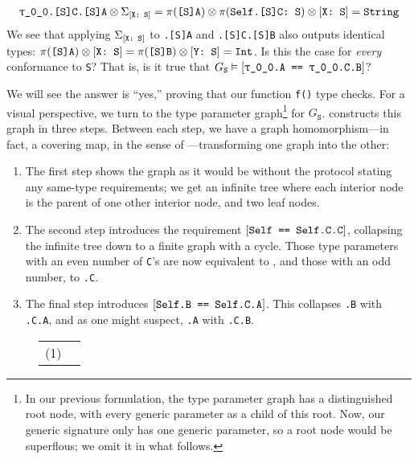 \documentclass[../generics]{subfiles}
\begin{document}
\begin{example}
\begin{gather*}
\texttt{\texttt{$\uptau$\_0\_0}.[S]C.[S]A}\otimes\Sigma_{[\texttt{X:~S}]}=\pi(\texttt{[S]A})\otimes\pi(\texttt{Self.[S]C:~S})\otimes[\texttt{X:~S}]=\texttt{String}
\end{gather*}
We see that applying $\Sigma_{[\texttt{X:~S}]}$ to \texttt{.[S]A} and \texttt{.[S]C.[S]B} also outputs identical types: $\pi(\texttt{[S]A})\otimes[\texttt{X:~S}]=\pi(\texttt{[S]B})\otimes[\texttt{Y:~S}]=\texttt{Int}$. Is this the case for \emph{every} conformance to \texttt{S}? That is, is it true that $G_\texttt{S}\vDash[\texttt{\texttt{\texttt{$\uptau$\_0\_0}.A} == \texttt{\texttt{$\uptau$\_0\_0}.C.B}}]$?

We will see the answer is ``yes,'' proving that our function \texttt{f()} type checks. For a visual perspective, we turn to the type parameter graph\footnote{In our previous formulation, the type parameter graph has a distinguished root node, with every generic parameter as a child of this root. Now, our generic signature only has one generic parameter, so a root node would be superflous; we omit it in what follows.} for $G_\texttt{S}$.  constructs this graph in three steps. Between each step, we have a graph homomorphism---in fact, a covering map, in the sense of ---transforming one graph into the other:
\begin{enumerate}
\item The first step shows the graph as it would be without the protocol stating any same-type requirements; we get an infinite tree where each interior node is the parent of one other interior node, and two leaf nodes.

\item The second step introduces the requirement $[\texttt{Self == Self.C.C}]$, collapsing the infinite tree down to a finite graph with a cycle. Those type parameters with an even number of \texttt{C}'s are now equivalent to \texttt{}, and those with an odd number, to \texttt{.C}.

\item The final step introduces $[\texttt{Self.B == Self.C.A}]$. This collapses \texttt{.B} with \texttt{.C.A}, and as one might suspect, \texttt{.A} with \texttt{.C.B}.
\end{enumerate}

\begin{figure}\label{protocol s fig}
\begin{center}
\begin{tabular}{lc}
\toprule
(1) &
\begin{tikzpicture}


\end{tikzpicture}
\end{tabular}
\end{center}
\end{figure}
\end{example}
\end{document}
